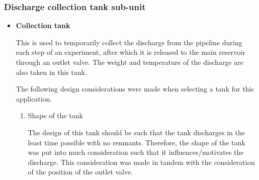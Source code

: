 \subsubsection{Discharge collection tank sub-unit}
\begin{itemize}
\item \textbf{Collection tank}
\par
This is used to temporarily collect the discharge from the pipeline during each step of an experiment, after which it is released to the main reservoir through an outlet valve. The weight and temperature of the discharge are also taken in this tank. 
\par
The following design considerations were made when selecting a tank for this application.
\begin{enumerate}
    \item Shape of the tank 
    \par
    The design of this tank should be such that the tank discharges in the least time possible with no remnants. Therefore, the shape of the tank was put into much consideration such that it influences/motivates the discharge. This consideration was made in tandem with the consideration of the position of the outlet valve.
    

\end{enumerate}
\end{itemize}

